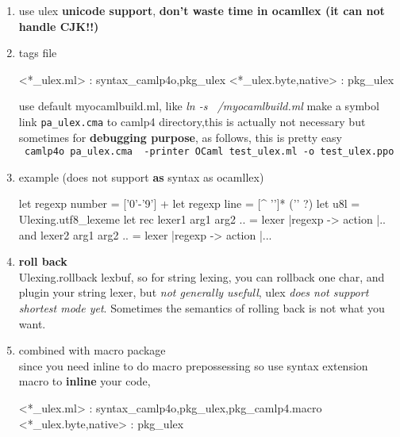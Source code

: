 



\begin{enumerate}
\item use ulex  \textbf{ unicode support}, \textbf{ don't waste time in ocamllex (it can not handle CJK!!) }
\item tags file 


\begin{bluecode}
<*_ulex.ml> : syntax_camlp4o,pkg_ulex
<*_ulex.{byte,native}> : pkg_ulex
\end{bluecode}



  use default myocamlbuild.ml, like \emph{ln -s ~/myocamlbuild.ml}
  make a symbol link \verb|pa_ulex.cma| to camlp4 directory,this is actually not necessary
  but sometimes for \textbf{ debugging purpose}, as follows, this is pretty easy \\
  \verb| camlp4o pa_ulex.cma  -printer OCaml test_ulex.ml -o test_ulex.ppo|

\item example (does not support \textbf{ as } syntax as ocamllex)
  

\begin{bluecode}
let regexp number = ['0'-'9'] +
let regexp line = [^ '\n']* ('\n' ?)
let u8l = Ulexing.utf8_lexeme
let rec lexer1 arg1 arg2 .. = lexer
|regexp -> action |..
and lexer2 arg1 arg2 .. = lexer
|regexp -> action |... 
\end{bluecode}



  \item  \textbf{ roll back} \\
    Ulexing.rollback lexbuf, so for string lexing, you can rollback one char,
    and plugin your string lexer, but \textit{not generally usefull}, ulex \textit{does not support shortest mode yet}. Sometimes the  semantics of rolling back is not what you want.
  \item combined with macro package \\
    since you need inline to do macro prepossessing
    so use syntax extension macro to \textbf{ inline} your code,


\begin{bluetext}
<*_ulex.ml> : syntax_camlp4o,pkg_ulex,pkg_camlp4.macro
<*_ulex.{byte,native}> : pkg_ulex
\end{bluetext}



\end{enumerate}
